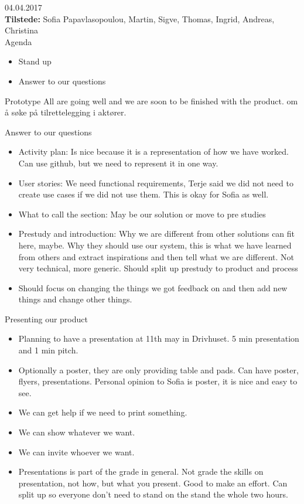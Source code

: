 {\Large{04.04.2017}}\\
\textbf{Tilstede:} Sofia Papavlasopoulou, Martin, Sigve, Thomas, Ingrid, Andreas, Christina\\


{\large{Agenda}}
\begin{itemize}
\setlength\itemsep{-0.7em}
    \item Stand up
    \item Answer to our questions
\end{itemize} 

{\large{Prototype}}
All are going well and we are soon to be finished with the product. om å søke på tilrettelegging i aktører.


{\large{Answer to our questions}}
\begin{itemize}
\setlength\itemsep{-0.7em}
    \item Activity plan: Is nice because it is a representation of how we have worked. Can use github, but we need to represent it in one way.
    \item User stories: We need functional requirements, Terje said we did not need to create use cases if we did not use them. This is okay for Sofia as well.
    \item What to call the section: May be our solution or move to pre studies
    \item Prestudy and introduction: Why we are different from other solutions can fit here, maybe. Why they should use our system, this is what we have learned from others and extract inspirations and then tell what we are different. Not very technical, more generic. Should split up prestudy to product and process
    \item Should focus on changing the things we got feedback on and then add new things and change other things.
\end{itemize}

{\large{Presenting our product}}
\begin{itemize} 
\setlength\itemsep{-0.7em}
    \item Planning to have a presentation at 11th may in Drivhuset. 5 min presentation and 1 min pitch.
    \item Optionally a poster, they are only providing table and pads. Can have poster, flyers, presentations. Personal opinion to Sofia is poster, it is nice and easy to see. 
    \item We can get help if we need to print something.
    \item We can show whatever we want. 
    \item We can invite whoever we want.
    \item Presentations is part of the grade in general. Not grade the skills on presentation, not how, but what you present. Good to make an effort.
Can split up so everyone don’t need to stand on the stand the whole two hours.
\end{itemize}

